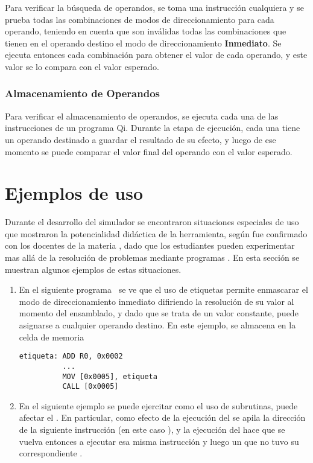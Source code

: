 \begin{enumerate}
Para verificar la búsqueda de operandos, se toma una instrucción cualquiera y se prueba todas las combinaciones de modos de direccionamiento para cada operando, teniendo en cuenta que son inválidas todas las combinaciones que tienen en el operando destino el modo de direccionamiento \textbf{Inmediato}. Se ejecuta entonces cada combinación para obtener el valor de cada operando, y este valor se lo compara con el valor esperado. 
 
\subsubsection{Almacenamiento de Operandos}

Para verificar el almacenamiento de operandos, se ejecuta cada una de las instrucciones de un programa Qi. Durante la etapa de ejecución, cada una tiene un operando destinado a guardar el resultado de su efecto, y luego de ese momento se puede comparar el valor final del operando con el valor esperado.

\section{Ejemplos de uso}

Durante el desarrollo del simulador se encontraron situaciones especiales de uso que mostraron la potencialidad didáctica de la herramienta, según fue confirmado con los docentes de la materia \orga, dado que los estudiantes pueden experimentar mas allá de la resolución de problemas mediante programas \qi. En esta sección se muestran algunos ejemplos de estas situaciones.

\begin{enumerate}

\item En el siguiente programa \qi\ se ve que el uso de etiquetas permite enmascarar el modo de direccionamiento inmediato difiriendo la resolución de su valor al momento del ensamblado, y dado que se trata de un valor constante, puede asignarse a cualquier operando destino. En este ejemplo, se almacena en la celda de memoria 

\begin{verbatim}
etiqueta: ADD R0, 0x0002 
          ...
          MOV [0x0005], etiqueta
          CALL [0x0005] 
\end{verbatim}

\item En el siguiente ejemplo se puede ejercitar como el uso de subrutinas, puede afectar el \ciclo. En particular, como efecto de la ejecución del  se apila la dirección de la siguiente instrucción (en este caso ), y la ejecución del  hace que se vuelva entonces a ejecutar esa misma instrucción y luego un  que no tuvo su correspondiente .


\end{enumerate}
\end{enumerate}
